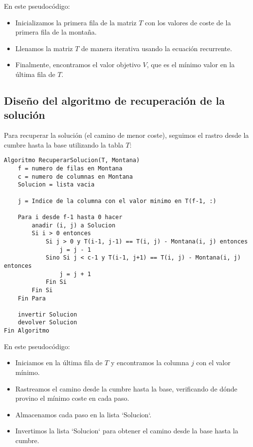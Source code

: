 En este pseudocódigo:
\begin{itemize}
    \item Inicializamos la primera fila de la matriz $T$ con los valores de coste de la primera fila de la montaña.
    \item Llenamos la matriz $T$ de manera iterativa usando la ecuación recurrente.
    \item Finalmente, encontramos el valor objetivo $V$, que es el mínimo valor en la última fila de $T$.
\end{itemize}

\subsection{Diseño del algoritmo de recuperación de la solución}
Para recuperar la solución (el camino de menor coste), seguimos el rastro desde la cumbre hasta la base utilizando la tabla $T$:

\newpage
\begin{lstlisting}
Algoritmo RecuperarSolucion(T, Montana)
    f = numero de filas en Montana
    c = numero de columnas en Montana
    Solucion = lista vacia

    j = Indice de la columna con el valor minimo en T(f-1, :)

    Para i desde f-1 hasta 0 hacer
        anadir (i, j) a Solucion
        Si i > 0 entonces
            Si j > 0 y T(i-1, j-1) == T(i, j) - Montana(i, j) entonces
                j = j - 1
            Sino Si j < c-1 y T(i-1, j+1) == T(i, j) - Montana(i, j) entonces
                j = j + 1
            Fin Si
        Fin Si
    Fin Para

    invertir Solucion
    devolver Solucion
Fin Algoritmo
\end{lstlisting}

En este pseudocódigo:
\begin{itemize}
    \item Iniciamos en la última fila de $T$ y encontramos la columna $j$ con el valor mínimo.
    \item Rastreamos el camino desde la cumbre hasta la base, verificando de dónde provino el mínimo coste en cada paso.
    \item Almacenamos cada paso en la lista `Solucion`.
    \item Invertimos la lista `Solucion` para obtener el camino desde la base hasta la cumbre.
\end{itemize}